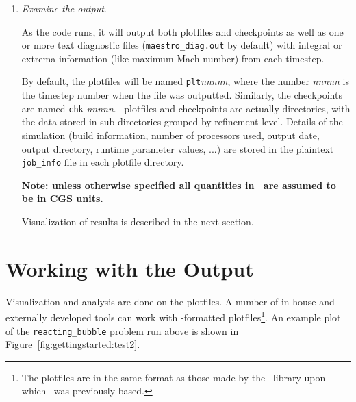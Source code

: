 \begin{enumerate}
  \maestro\ is run simply as:
  \begin{verbatim}
 ./main.Linux.Intel.exe inputs_2d
  \end{verbatim}
  We can also override the default value of any runtime parameter by
  specifying it on the commandline as
  \begin{verbatim}
 ./main.Linux.Intel.exe inputs_2d --parameter value
  \end{verbatim}

  As the code runs, a lot of information will pass through the screen.
  For each timestep, each of the steps 1 through 12 shown in the
  \maestro\ flowchart (Chapter~\ref{ch:flowchart}) will be shown along
  with diagnostic information about the solution.  Upon completion
  some memory usage information is printed.


\item {\em Examine the output}.
  
  As the code runs, it will output both plotfiles and checkpoints as
  well as one or more text diagnostic files ({\tt maestro\_diag.out}
  by default) with integral or extrema information (like maximum Mach
  number) from each timestep.

  By default, the plotfiles will be named {\tt plt}{\em nnnnn}, where
  the number {\em nnnnn} is the timestep number when the file was
  outputted.  Similarly, the checkpoints are named {\tt chk}{\em
    nnnnn}.  \amrex\ plotfiles and checkpoints are actually
  directories, with the data stored in sub-directories grouped by
  refinement level.  Details of the simulation (build information,
  number of processors used, output date, output directory, runtime
  parameter values, ...)  are stored in the plaintext {\tt job\_info}
  file in each plotfile directory.

  {\bf Note: unless otherwise specified all quantities in
    \maestro\ are assumed to be in CGS units.}

  Visualization of results is described in the next section.


\end{enumerate}


\section{Working with the Output}

Visualization and analysis are done on the plotfiles.  A number of
in-house and externally developed tools can work with \amrex-formatted
plotfiles\footnote{The plotfiles are in the same format as those made
  by the \boxlib\ library upon which \maestro\ was previously based.}.
An example plot of the {\tt reacting\_bubble} problem run above is
shown in Figure~\ref{fig:gettingstarted:test2}.

